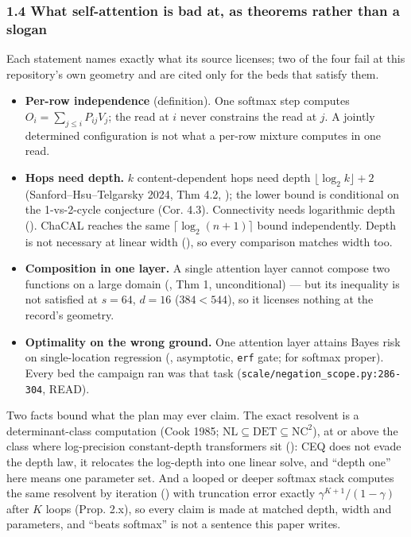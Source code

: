 \documentclass[11pt,a4paper]{article}
\theoremstyle{plain}
\theoremstyle{definition}
\theoremstyle{remark}
\providecommand{\tightlist}{%
  \setlength{\itemsep}{0pt}\setlength{\parskip}{0pt}}
\begin{document}
\subsubsection{1.4 What self-attention is bad at, as theorems rather
than a
slogan}\label{what-self-attention-is-bad-at-as-theorems-rather-than-a-slogan}

Each statement names exactly what its source licenses; two of the four
fail at this repository's own geometry and are cited only for the beds
that satisfy them.

\begin{itemize}
\tightlist
\item
  \textbf{Per-row independence} (definition). One softmax step computes
  \(O_i=\sum_{j\le i}P_{ij}V_j\); the read at \(i\) never constrains the
  read at \(j\). A jointly determined configuration is not what a
  per-row mixture computes in one read.
\item
  \textbf{Hops need depth.} \(k\) content-dependent hops need depth
  \(\lfloor\log_2 k\rfloor+2\) (Sanford--Hsu--Telgarsky 2024, Thm 4.2,
  \citep{sanford-2024-logdepth}); the lower bound is conditional on the
  1-vs-2-cycle conjecture (Cor. 4.3). Connectivity needs logarithmic
  depth (\citep{sanford-2024-graph-algorithms}). ChaCAL reaches the same
  \(\lceil\log_2(n+1)\rceil\) bound independently. Depth is not
  necessary at linear width (\citep{yehudai-2025-depthwidth}), so every
  comparison matches width too.
\item
  \textbf{Composition in one layer.} A single attention layer cannot
  compose two functions on a large domain
  (\citep{peng-2024-transformer-limitations}, Thm 1, unconditional) ---
  but its inequality is not satisfied at \(s=64\), \(d=16\)
  (\(384<544\)), so it licenses nothing at the record's geometry.
\item
  \textbf{Optimality on the wrong ground.} One attention layer attains
  Bayes risk on single-location regression
  (\citep{marion-2025-single-location}, asymptotic, \texttt{erf} gate;
  \citep{duranthon-2026-softmax-advantage} for softmax proper). Every
  bed the campaign ran was that task
  (\texttt{scale/negation\_scope.py:286-304}, READ).
\end{itemize}

Two facts bound what the plan may ever claim. The exact resolvent is a
determinant-class computation (Cook 1985;
\(\mathrm{NL}\subseteq\mathrm{DET}\subseteq
\mathrm{NC}^2\)), at or above the class where log-precision
constant-depth transformers sit (\citep{merrill-2023-parallelism}): CEQ
does not evade the depth law, it relocates the log-depth into one linear
solve, and ``depth one'' here means one parameter set. And a looped or
deeper softmax stack computes the same resolvent by iteration
(\citep{wang-2024-incontext-td}) with truncation error exactly
\(\gamma^{K+1}/(1-\gamma)\) after \(K\) loops (Prop. 2.x), so every
claim is made at matched depth, width and parameters, and ``beats
softmax'' is not a sentence this paper writes.
\end{document}
